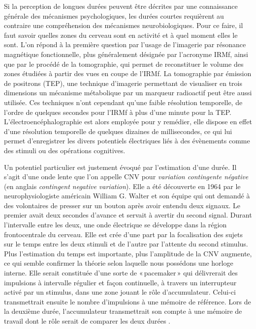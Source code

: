 \documentclass[12pt,fleqn,oneside,french,openany]{book} %
\begin{document}
Si la perception de longues durées peuvent être décrites par une connaissance générale des mécanismes psychologiques, les durées courtes requièrent au contraire une compréhension des mécanismes neurobiologiques. Pour ce faire, il faut savoir quelles zones du cerveau sont en activité et à quel moment elles le sont. L'on répond à la première question par l'usage de l'imagerie par résonance magnétique fonctionnelle, plus généralement désignée par l'acronyme IRMf, ainsi que par le procédé de la tomographie, qui permet de reconstituer le volume des zones étudiées à partir des vues en coupe de l'IRMf. La tomographie par émission de positrons (TEP), une technique d'imagerie permettant de visualiser en trois dimensions un mécanisme métabolique par un marqueur radioactif peut être aussi utilisée. Ces techniques n'ont cependant qu'une faible résolution temporelle, de l'ordre de quelques secondes pour l'IRMf à plus d'une minute pour la TEP. L'électroencéphalographie est alors employée pour y remédier, elle dispose en effet d'une résolution temporelle de quelques dizaines de millisecondes, ce qui lui permet d'enregistrer les divers potentiels électriques liés à des évènements comme des stimuli ou des opérations cognitives. 

Un potentiel particulier est justement évoqué par l'estimation d'une durée. Il s'agit d'une onde lente que l'on appelle CNV pour \emph{variation contingente négative} (en anglais \emph{contingent negative variation}). Elle a été découverte en 1964 par le neurophysiologiste américain William G. Walter et son équipe qui ont demandé à des volontaires de presser sur un bouton après avoir entendu deux signaux. Le premier avait deux secondes d'avance et servait à avertir du second signal. Durant l'intervalle entre les deux, une onde électrique se développe dans la région frontocentrale du cerveau. Elle est crée d'une part par la focalisation des sujets sur le temps entre les deux stimuli et de l'autre par l'attente du second stimulus. Plus l'estimation du temps est importante, plus l'amplitude de la CNV augmente, ce qui semble confirmer la théorie selon laquelle nous possédons une horloge interne. Elle serait constituée d'une sorte de «\,pacemaker\,» qui délivrerait des impulsions à intervalle régulier et façon continuelle, à travers un interrupteur activé par un stimulus, dans une zone jouant le rôle d'accumulateur. Celui-ci transmettrait ensuite le nombre d'impulsions à une mémoire de référence. Lors de la deuxième durée, l'accumulateur transmettrait son compte à une mémoire de travail dont le rôle serait de comparer les deux durées \cite{gibbon1984}.
\end{document}
